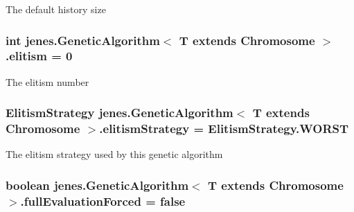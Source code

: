 The default history size \hypertarget{classjenes_1_1_genetic_algorithm_3_01_t_01extends_01_chromosome_01_4_ac4280b01e7da0ddc049050b19e28b8b9}{
\subsubsection[{elitism}]{\setlength{\rightskip}{0pt plus 5cm}int jenes.\-Genetic\-Algorithm$<$ T extends Chromosome $>$.elitism = 0\hspace{0.3cm}{\ttfamily [protected]}}}\label{classjenes_1_1_genetic_algorithm_3_01_t_01extends_01_chromosome_01_4_ac4280b01e7da0ddc049050b19e28b8b9}
The elitism number \hypertarget{classjenes_1_1_genetic_algorithm_3_01_t_01extends_01_chromosome_01_4_aacba3e1823ba66a2dd6d3c902f8ff719}{
\subsubsection[{elitism\-Strategy}]{\setlength{\rightskip}{0pt plus 5cm}Elitism\-Strategy jenes.\-Genetic\-Algorithm$<$ T extends Chromosome $>$.elitism\-Strategy = {\bf Elitism\-Strategy.\-W\-O\-R\-S\-T}\hspace{0.3cm}{\ttfamily [protected]}}}\label{classjenes_1_1_genetic_algorithm_3_01_t_01extends_01_chromosome_01_4_aacba3e1823ba66a2dd6d3c902f8ff719}
The elitism strategy used by this genetic algorithm \hypertarget{classjenes_1_1_genetic_algorithm_3_01_t_01extends_01_chromosome_01_4_adb627d0c6d6744f53ef5c3b7506913e9}{
\subsubsection[{full\-Evaluation\-Forced}]{\setlength{\rightskip}{0pt plus 5cm}boolean jenes.\-Genetic\-Algorithm$<$ T extends Chromosome $>$.full\-Evaluation\-Forced = false\hspace{0.3cm}{\ttfamily [protected]}}}\label{classjenes_1_1_genetic_algorithm_3_01_t_01extends_01_chromosome_01_4_adb627d0c6d6744f53ef5c3b7506913e9}
